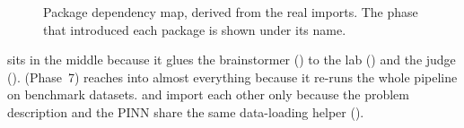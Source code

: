\begin{figure}[!htb]
\centering

\caption{Package dependency map, derived from the real imports. The phase that introduced each package is shown
under its name.}
\label{fig:packages}
\end{figure}

\begin{intuition}
 sits in the middle because it glues the brainstormer () to the lab () and the
judge ().  (Phase~7) reaches into almost everything because it re-runs the whole
pipeline on benchmark datasets.  and  import each other only because the problem description
and the PINN share the same data-loading helper ().
\end{intuition}
